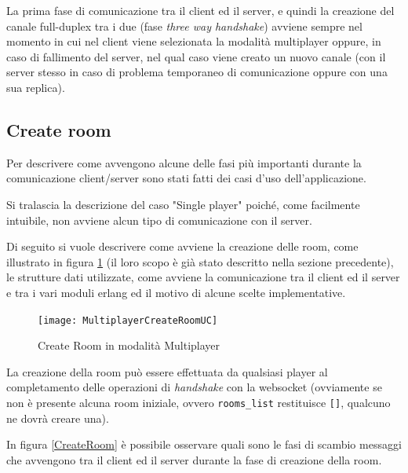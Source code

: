 \documentclass[paper=a4, fontsize=11pt]{scrartcl} %
\numberwithin{equation}{section} %
\numberwithin{figure}{section} %
\numberwithin{table}{section} %
\begin{document}
La prima fase di comunicazione tra il client ed il server, e quindi la creazione del canale full-duplex tra i due (fase \textit{three way handshake}) avviene sempre nel momento in cui nel client viene selezionata la modalità multiplayer oppure, in caso di fallimento del server, nel qual caso viene creato un nuovo canale (con il server stesso in caso di problema temporaneo di comunicazione oppure con una sua replica).
\subsection{Create room}
Per descrivere come avvengono alcune delle fasi più importanti durante la comunicazione client/server sono stati fatti dei casi d'uso dell'applicazione.

Si tralascia la descrizione del caso "Single player" poiché, come facilmente intuibile, non avviene alcun tipo di comunicazione con il server.

Di seguito si vuole descrivere come avviene la creazione delle room, come illustrato in figura \ref{CreateRoomUC} (il loro scopo è già stato descritto nella sezione precedente), le strutture dati utilizzate, come avviene la comunicazione tra il client ed il server e tra i vari moduli erlang ed il motivo di alcune scelte implementative.

\begin{figure}
\centering
\texttt{[image: MultiplayerCreateRoomUC]}
\caption{Create Room in modalità Multiplayer}
\label{CreateRoomUC}
\end{figure}

La creazione della room può essere effettuata da qualsiasi player al completamento delle operazioni di \textit{handshake} con la websocket (ovviamente se non è presente alcuna room iniziale, ovvero \texttt{rooms\_list} restituisce \texttt{[]}, qualcuno ne dovrà creare una).

In figura \ref{CreateRoom} è possibile osservare quali sono le fasi di scambio messaggi che avvengono tra il client ed il server durante la fase di creazione della room.
\end{document}
